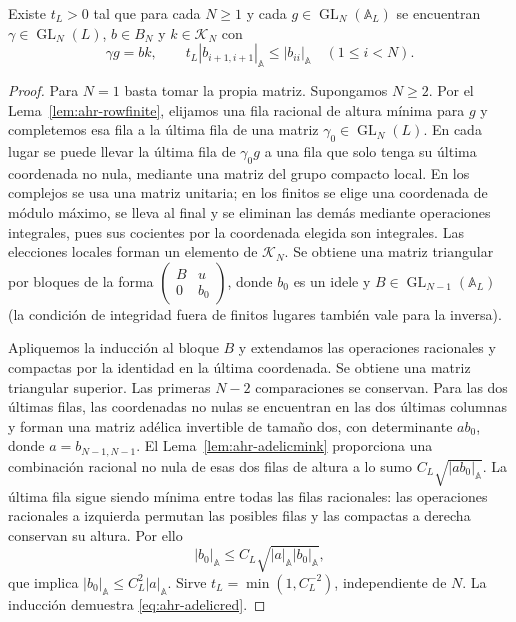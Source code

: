 \begin{proposicion}
\label{prop:ahr-adelicred}
Existe $t_L>0$ tal que para cada $N\ge1$ y cada $g\in\operatorname{GL}_N(\mathbb A_L)$ se encuentran $\gamma\in\operatorname{GL}_N(L)$, $b\in B_N$ y $k\in\mathcal K_N$ con
\begin{equation}
 \gamma g=bk,\qquad
 t_L|b_{i+1,i+1}|_{\mathbb A}\le |b_{ii}|_{\mathbb A}
 \quad(1\le i<N).
 \label{eq:ahr-adelicred}
\end{equation}
\end{proposicion}
\begin{proof}
Para $N=1$ basta tomar la propia matriz. Supongamos $N\ge2$. Por el Lema~\ref{lem:ahr-rowfinite}, elijamos una fila racional de altura mínima para $g$ y completemos esa fila a la última fila de una matriz $\gamma_0\in\operatorname{GL}_N(L)$. En cada lugar se puede llevar la última fila de $\gamma_0 g$ a una fila que solo tenga su última coordenada no nula, mediante una matriz del grupo compacto local. En los complejos se usa una matriz unitaria; en los finitos se elige una coordenada de módulo máximo, se lleva al final y se eliminan las demás mediante operaciones integrales, pues sus cocientes por la coordenada elegida son integrales. Las elecciones locales forman un elemento de $\mathcal K_N$. Se obtiene una matriz triangular por bloques de la forma $\left(\begin{smallmatrix}B&u\\0&b_0\end{smallmatrix}\right)$, donde $b_0$ es un idele y $B\in\operatorname{GL}_{N-1}(\mathbb A_L)$ (la condición de integridad fuera de finitos lugares también vale para la inversa).

Apliquemos la inducción al bloque $B$ y extendamos las operaciones racionales y compactas por la identidad en la última coordenada. Se obtiene una matriz triangular superior. Las primeras $N-2$ comparaciones se conservan. Para las dos últimas filas, las coordenadas no nulas se encuentran en las dos últimas columnas y forman una matriz adélica invertible de tamaño dos, con determinante $ab_0$, donde $a=b_{N-1,N-1}$. El Lema~\ref{lem:ahr-adelicmink} proporciona una combinación racional no nula de esas dos filas de altura a lo sumo $C_L\sqrt{|ab_0|_{\mathbb A}}$. La última fila sigue siendo mínima entre todas las filas racionales: las operaciones racionales a izquierda permutan las posibles filas y las compactas a derecha conservan su altura. Por ello
\[
 |b_0|_{\mathbb A}\le C_L\sqrt{|a|_{\mathbb A}|b_0|_{\mathbb A}},
\]
que implica $|b_0|_{\mathbb A}\le C_L^2|a|_{\mathbb A}$. Sirve $t_L=\min(1,C_L^{-2})$, independiente de $N$. La inducción demuestra \eqref{eq:ahr-adelicred}.
\end{proof}

